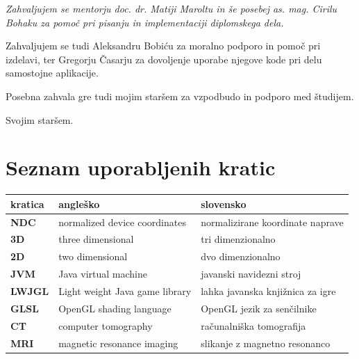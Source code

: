 \documentclass[a4paper, 12pt]{book}
\newcommand{\clearemptydoublepage}{\newpage{\pagestyle{empty}\cleardoublepage}}
\begin{document}
\thispagestyle{empty}\mbox{}\vfill\null\it%
Zahvaljujem se mentorju doc. dr. Matiji Maroltu in še posebej as. mag. Cirilu Bohaku za pomoč pri pisanju in implementaciji diplomskega dela. 

Zahvaljujem se tudi Aleksandru Bobiću za moralno podporo in pomoč pri izdelavi, ter Gregorju Časarju za dovoljenje uporabe njegove kode pri delu samostojne aplikacije.

Posebna zahvala gre tudi mojim staršem za vzpodbudo in podporo med študijem.
\rm\normalfont

\clearemptydoublepage

\thispagestyle{empty}\mbox{}{\textheight}\mbox{}\hfill\begin{minipage}{0.55\textwidth}%
\normalfont\end{minipage}
Svojim staršem.
\clearemptydoublepage

\def\thepage{}%
\tableofcontents{}


\clearemptydoublepage


\chapter*{Seznam uporabljenih kratic}

\begin{tabular}{l|l|l}
  {\bf kratica} & {\bf angleško} & {\bf slovensko} \\ \hline
  {\bf NDC} & normalized device coordinates & normalizirane koordinate naprave \\
  {\bf 3D} & three dimensional & tri dimenzionalno \\
  {\bf 2D} & two dimensional & dvo dimenzionalno \\
  {\bf JVM} & Java virtual machine & javanski navidezni stroj \\
  {\bf LWJGL} & Light weight Java game library & lahka javanska knjižnica za igre \\
  {\bf GLSL} & OpenGL shading language & OpenGL jezik za senčilnike \\
  {\bf CT} & computer tomography & računalniška tomografija \\
  {\bf MRI} & magnetic resonance imaging & slikanje z magnetno resonanco\\
\end{tabular}
\end{document}
